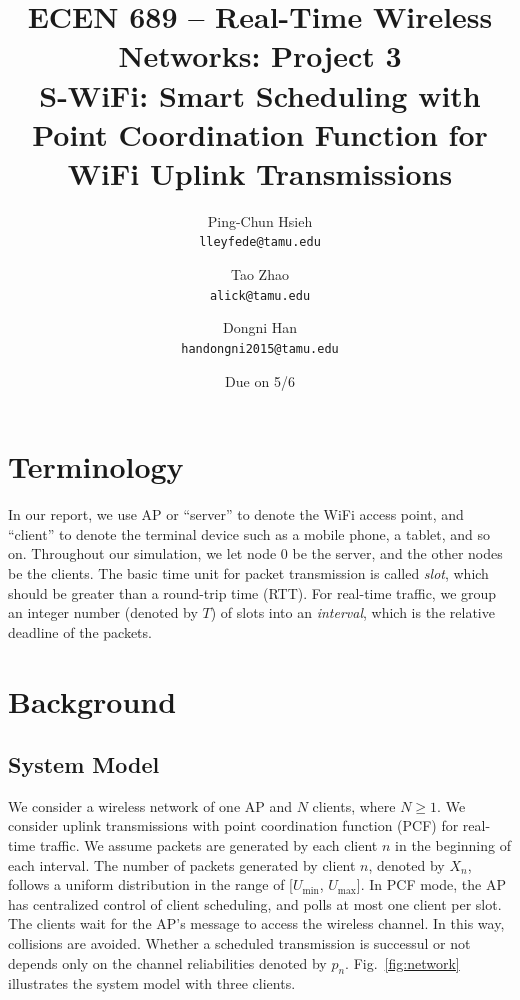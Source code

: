 \documentclass{article}
\begin{document}
\title{\bfseries ECEN 689 -- Real-Time Wireless Networks: Project 3\\
S-WiFi: Smart Scheduling with Point Coordination Function for WiFi Uplink Transmissions}
\date{Due on 5/6}
\author{%
Ping-Chun Hsieh\\
\texttt{lleyfede@tamu.edu}
\and
Tao Zhao\\
\texttt{alick@tamu.edu}
\and
Dongni Han\\
\texttt{handongni2015@tamu.edu}
}
\maketitle

\section*{Terminology}

In our report, we use AP or ``server'' to denote the WiFi access point, and ``client'' to denote the terminal device such as a mobile phone, a tablet, and so on. Throughout our simulation, we let node $0$ be the server, and the other nodes be the clients. The basic time unit for packet transmission is called \emph{slot}, which should be greater than a round-trip time (RTT). For real-time traffic, we group an integer number (denoted by $T$) of slots into an \emph{interval}, which is the relative deadline of the packets.

\section{Background}
\subsection{System Model}
We consider a wireless network of one AP and $N$ clients, where $N\ge1$. We consider uplink transmissions with point coordination function (PCF) for real-time traffic. We assume packets are generated by each client $n$ in the beginning of each interval. The number of packets generated by client $n$, denoted by $X_n$, follows a uniform distribution in the range of [$U_{\min}$, $U_{\max}$]. In PCF mode, the AP has centralized control of client scheduling, and polls at most one client per slot. The clients wait for the AP's message to access the wireless channel. In this way, collisions are avoided. Whether a scheduled transmission is successul or not depends only on the channel reliabilities denoted by $p_n$. Fig.~\ref{fig:network} illustrates the system model with three clients.
\end{document}
